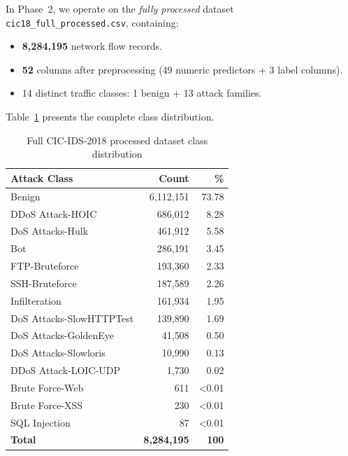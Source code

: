 \documentclass[10pt,conference]{IEEEtran}
\begin{document}
In Phase~2, we operate on the \emph{fully processed} dataset
\texttt{cic18\_full\_processed.csv}, containing:
\begin{itemize}[leftmargin=*,noitemsep]
  \item \textbf{8{,}284{,}195} network flow records.
  \item \textbf{52} columns after preprocessing (49 numeric predictors +
        3 label columns).
  \item 14 distinct traffic classes: 1 benign + 13 attack families.
\end{itemize}

Table~\ref{tab:full_dist} presents the complete class distribution.

\begin{table}[H]
\centering
\caption{Full CIC-IDS-2018 processed dataset class distribution}
\label{tab:full_dist}
\begin{tabular}{lrr}
\toprule
\textbf{Attack Class} & \textbf{Count} & \textbf{\%} \\
\midrule
Benign                    & 6{,}112{,}151 & 73.78 \\
DDoS Attack-HOIC          &   686{,}012   &  8.28 \\
DoS Attacks-Hulk          &   461{,}912   &  5.58 \\
Bot                       &   286{,}191   &  3.45 \\
FTP-Bruteforce            &   193{,}360   &  2.33 \\
SSH-Bruteforce            &   187{,}589   &  2.26 \\
Infilteration             &   161{,}934   &  1.95 \\
DoS Attacks-SlowHTTPTest  &   139{,}890   &  1.69 \\
DoS Attacks-GoldenEye     &    41{,}508   &  0.50 \\
DoS Attacks-Slowloris     &    10{,}990   &  0.13 \\
DDoS Attack-LOIC-UDP      &     1{,}730   &  0.02 \\
Brute Force-Web           &       611     & <0.01 \\
Brute Force-XSS           &       230     & <0.01 \\
SQL Injection             &        87     & <0.01 \\
\midrule
\textbf{Total}            & \textbf{8{,}284{,}195} & \textbf{100} \\
\bottomrule
\end{tabular}
\end{table}
\end{document}
